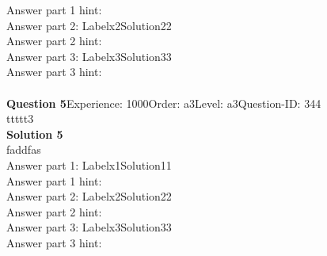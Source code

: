 \documentclass{article}
\begin{document}
Answer part 1 hint: \hspace{15pt}\\
Answer part 2: \hspace{10pt}Label\hspace{10pt}x2\hspace{10pt}Solution\hspace{10pt}22\\
Answer part 2 hint: \hspace{15pt}\\
Answer part 3: \hspace{10pt}Label\hspace{10pt}x3\hspace{10pt}Solution\hspace{10pt}33\\
Answer part 3 hint: \hspace{15pt}\\
\\[4pt]
\noindent\textbf{Question 5}\hspace{20pt}Experience: 1000\hspace{20pt}Order: a3\hspace{20pt}Level: a3\hspace{20pt}Question-ID: 344\\[2pt]
ttttt3\\[4pt]
\noindent\textbf{Solution 5}\\[2pt]
faddfas\\[4pt]
Answer part 1: \hspace{10pt}Label\hspace{10pt}x1\hspace{10pt}Solution\hspace{10pt}11\\
Answer part 1 hint: \hspace{15pt}\\
Answer part 2: \hspace{10pt}Label\hspace{10pt}x2\hspace{10pt}Solution\hspace{10pt}22\\
Answer part 2 hint: \hspace{15pt}\\
Answer part 3: \hspace{10pt}Label\hspace{10pt}x3\hspace{10pt}Solution\hspace{10pt}33\\
Answer part 3 hint: \hspace{15pt}\\
\end{document}
